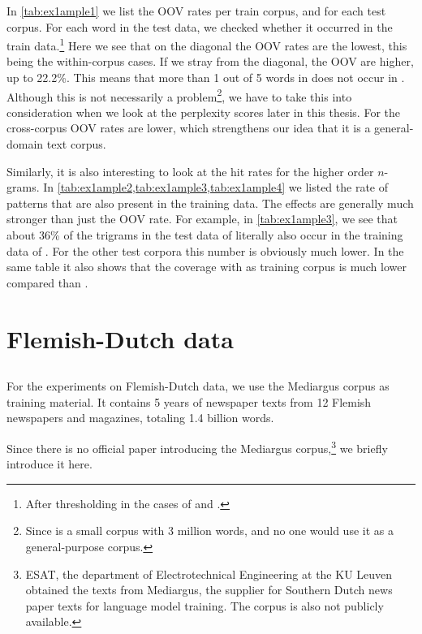 In \cref{tab:ex1ample1} we list the OOV rates per train corpus, and for each test corpus. For each word in the test data, we checked whether it occurred in the train data.\footnote{After thresholding in the cases of \obw and \wp.}
Here we see that on the diagonal the OOV rates are the lowest, this being the within-corpus cases. If we stray from the diagonal, the OOV are higher, up to 22.2\%. This means that more than 1 out of 5 words in \wp does not occur in \emea. Although this is not necessarily a problem\footnote{Since \emea is a small corpus with 3 million words, and no one would use it as a general-purpose corpus.}, we have to take this into consideration when we look at the perplexity scores later in this thesis.
For \obw the cross-corpus OOV rates are lower, which strengthens our idea that it is a general-domain text corpus.

Similarly, it is also interesting to look at the hit rates for the higher order $n$-grams. In \cref{tab:ex1ample2,tab:ex1ample3,tab:ex1ample4} we listed the rate of patterns that are also present in the training data. The effects are generally much stronger than just the OOV rate. For example, in \cref{tab:ex1ample3}, we see that about 36\% of the trigrams in the test data of \obw literally also occur in the training data of \obw. For the other test corpora this number is obviously much lower. In the same table it also shows that the coverage with \emea as training corpus is much lower compared than \obw.
    
\section{Flemish-Dutch data}
\subsection{\mediargus}
For the experiments on Flemish-Dutch data, we use the Mediargus corpus as training material. It contains 5 years of newspaper texts from 12 Flemish newspapers and magazines, totaling 1.4 billion words.

Since there is no official paper introducing the Mediargus corpus,\footnote{ESAT, the department of Electrotechnical Engineering at the KU Leuven obtained the texts from Mediargus, the supplier for Southern Dutch news paper texts for language model training. The corpus is also not publicly available.} we briefly introduce it here.

